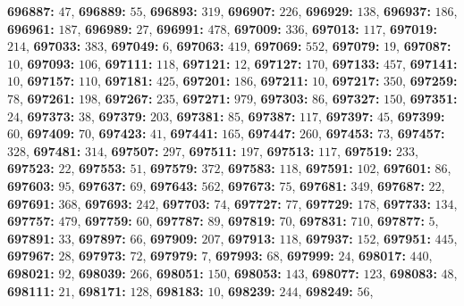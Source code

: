 \textsf{\bfseries 696887:} $47$, \textsf{\bfseries 696889:} $55$, \textsf{\bfseries 696893:} $319$, \textsf{\bfseries 696907:} $226$, \textsf{\bfseries 696929:} $138$, \textsf{\bfseries 696937:} $186$, \textsf{\bfseries 696961:} $187$, \textsf{\bfseries 696989:} $27$, \textsf{\bfseries 696991:} $478$, \textsf{\bfseries 697009:} $336$, \textsf{\bfseries 697013:} $117$, \textsf{\bfseries 697019:} $214$, \textsf{\bfseries 697033:} $383$, \textsf{\bfseries 697049:} $6$, \textsf{\bfseries 697063:} $419$, \textsf{\bfseries 697069:} $552$, \textsf{\bfseries 697079:} $19$, \textsf{\bfseries 697087:} $10$, \textsf{\bfseries 697093:} $106$, \textsf{\bfseries 697111:} $118$, \textsf{\bfseries 697121:} $12$, \textsf{\bfseries 697127:} $170$, \textsf{\bfseries 697133:} $457$, \textsf{\bfseries 697141:} $10$, \textsf{\bfseries 697157:} $110$, \textsf{\bfseries 697181:} $425$, \textsf{\bfseries 697201:} $186$, \textsf{\bfseries 697211:} $10$, \textsf{\bfseries 697217:} $350$, \textsf{\bfseries 697259:} $78$, \textsf{\bfseries 697261:} $198$, \textsf{\bfseries 697267:} $235$, \textsf{\bfseries 697271:} $979$, \textsf{\bfseries 697303:} $86$, \textsf{\bfseries 697327:} $150$, \textsf{\bfseries 697351:} $24$, \textsf{\bfseries 697373:} $38$, \textsf{\bfseries 697379:} $203$, \textsf{\bfseries 697381:} $85$, \textsf{\bfseries 697387:} $117$, \textsf{\bfseries 697397:} $45$, \textsf{\bfseries 697399:} $60$, \textsf{\bfseries 697409:} $70$, \textsf{\bfseries 697423:} $41$, \textsf{\bfseries 697441:} $165$, \textsf{\bfseries 697447:} $260$, \textsf{\bfseries 697453:} $73$, \textsf{\bfseries 697457:} $328$, \textsf{\bfseries 697481:} $314$, \textsf{\bfseries 697507:} $297$, \textsf{\bfseries 697511:} $197$, \textsf{\bfseries 697513:} $117$, \textsf{\bfseries 697519:} $233$, \textsf{\bfseries 697523:} $22$, \textsf{\bfseries 697553:} $51$, \textsf{\bfseries 697579:} $372$, \textsf{\bfseries 697583:} $118$, \textsf{\bfseries 697591:} $102$, \textsf{\bfseries 697601:} $86$, \textsf{\bfseries 697603:} $95$, \textsf{\bfseries 697637:} $69$, \textsf{\bfseries 697643:} $562$, \textsf{\bfseries 697673:} $75$, \textsf{\bfseries 697681:} $349$, \textsf{\bfseries 697687:} $22$, \textsf{\bfseries 697691:} $368$, \textsf{\bfseries 697693:} $242$, \textsf{\bfseries 697703:} $74$, \textsf{\bfseries 697727:} $77$, \textsf{\bfseries 697729:} $178$, \textsf{\bfseries 697733:} $134$, \textsf{\bfseries 697757:} $479$, \textsf{\bfseries 697759:} $60$, \textsf{\bfseries 697787:} $89$, \textsf{\bfseries 697819:} $70$, \textsf{\bfseries 697831:} $710$, \textsf{\bfseries 697877:} $5$, \textsf{\bfseries 697891:} $33$, \textsf{\bfseries 697897:} $66$, \textsf{\bfseries 697909:} $207$, \textsf{\bfseries 697913:} $118$, \textsf{\bfseries 697937:} $152$, \textsf{\bfseries 697951:} $445$, \textsf{\bfseries 697967:} $28$, \textsf{\bfseries 697973:} $72$, \textsf{\bfseries 697979:} $7$, \textsf{\bfseries 697993:} $68$, \textsf{\bfseries 697999:} $24$, \textsf{\bfseries 698017:} $440$, \textsf{\bfseries 698021:} $92$, \textsf{\bfseries 698039:} $266$, \textsf{\bfseries 698051:} $150$, \textsf{\bfseries 698053:} $143$, \textsf{\bfseries 698077:} $123$, \textsf{\bfseries 698083:} $48$, \textsf{\bfseries 698111:} $21$, \textsf{\bfseries 698171:} $128$, \textsf{\bfseries 698183:} $10$, \textsf{\bfseries 698239:} $244$, \textsf{\bfseries 698249:} $56$, 
